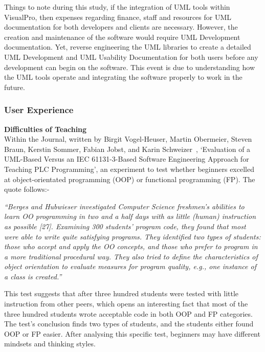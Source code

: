 \documentclass[conference]{IEEEtran}
\begin{document}
        Things to note during this study, if the integration of UML tools within VisualPro, then expenses regarding finance, staff and resources for UML documentation for both developers and clients are necessary. However, the creation and maintenance of the software would require UML Development documentation. Yet, reverse engineering the UML libraries to create a detailed UML Development and UML Usability Documentation for both users before any development can begin on the software. This event is due to understanding how the UML tools operate and integrating the software properly to work in the future.
        \subsubsection{User Experience}
          \textbf{Difficulties of Teaching}\\
            Within the Journal, written by Birgit Vogel-Heuser, Martin Obermeier, Steven Braun, Kerstin Sommer, Fabian Jobst, and Karin Schweizer~\cite{vogel-heuser_evaluation_2013}, `Evaluation of a UML-Based Versus an IEC 61131-3-Based Software Engineering Approach for Teaching PLC Programming', an experiment to test whether beginners excelled at object-orientated programming (OOP) or functional programming (FP). The quote follows:-

            \begin{center}
              \textit{``Berges and Hubwieser investigated Computer Science freshmen’s abilities to learn OO programming in two and a half days with as little (human) instruction as possible [27]. Examining 300 students’ program code, they found that most were able to write quite satisfying programs. They identified two types of students: those who accept and apply the OO concepts, and those who prefer to program in a more traditional procedural way. They also tried to define the characteristics of object orientation to evaluate measures for program quality, e.g., one instance of a class is created.''}~\cite{vogel-heuser_evaluation_2013}
            \end{center}

            This test suggests that after three hundred students were tested with little instruction from other peers, which opens an interesting fact that most of the three hundred students wrote acceptable code in both OOP and FP categories. The test's conclusion finds two types of students, and the students either found OOP or FP easier. After analysing this specific test, beginners may have different mindsets and thinking styles.
        
\end{document}
